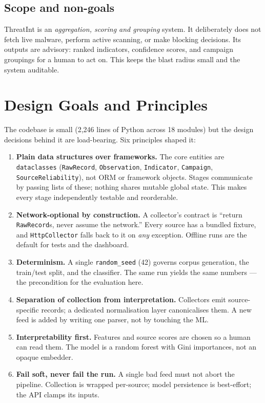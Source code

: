 \documentclass[11pt,a4paper]{article}
\newcommand{\code}[1]{\texttt{\small #1}}
\begin{document}
\subsection{Scope and non-goals}
ThreatInt is an \emph{aggregation, scoring and grouping} system. It deliberately
does not fetch live malware, perform active scanning, or make blocking
decisions. Its outputs are advisory: ranked indicators, confidence scores, and
campaign groupings for a human to act on. This keeps the blast radius small and
the system auditable.

\section{Design Goals and Principles}

The codebase is small (2{,}246 lines of Python across 18 modules) but the
design decisions behind it are load-bearing. Six principles shaped it:

\begin{enumerate}[leftmargin=1.4em,itemsep=3pt]
  \item \textbf{Plain data structures over frameworks.} The core entities are
    \code{dataclasses} (\code{RawRecord}, \code{Observation}, \code{Indicator},
    \code{Campaign}, \code{SourceReliability}), not ORM or framework objects.
    Stages communicate by passing lists of these; nothing shares mutable global
    state. This makes every stage independently testable and reorderable.
  \item \textbf{Network-optional by construction.} A collector's contract is
    ``return \code{RawRecord}s, never assume the network.'' Every source has a
    bundled fixture, and \code{HttpCollector} falls back to it on \emph{any}
    exception. Offline runs are the default for tests and the dashboard.
  \item \textbf{Determinism.} A single \code{random\_seed} (42) governs corpus
    generation, the train/test split, and the classifier. The same run yields
    the same numbers --- the precondition for the evaluation here.
  \item \textbf{Separation of collection from interpretation.} Collectors emit
    source-specific records; a dedicated normalisation layer canonicalises
    them. A new feed is added by writing one parser, not by touching the ML.
  \item \textbf{Interpretability first.} Features and source scores are chosen
    so a human can read them. The model is a random forest with Gini
    importances, not an opaque embedder.
  \item \textbf{Fail soft, never fail the run.} A single bad feed must not abort
    the pipeline. Collection is wrapped per-source; model persistence is
    best-effort; the API clamps its inputs.
\end{enumerate}
\end{document}
